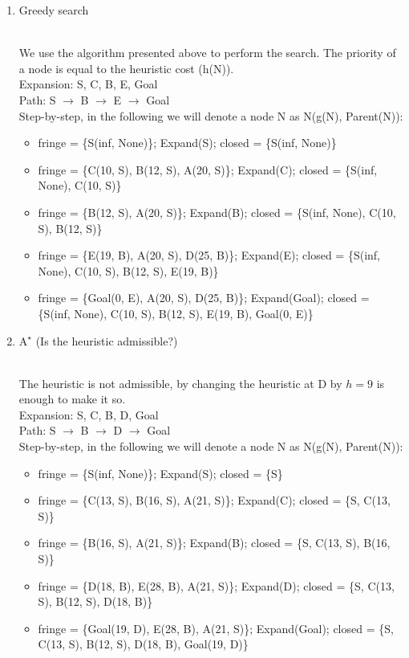 \documentclass[9pt,a4paper]{extarticle}
\newenvironment{solution}
    {%
    \color{red}
    }
    { 
    \color{black}
    }
\begin{document}
\begin{enumerate}
\begin{solution}
\begin{itemize}
        \end{itemize}
        \end{solution}
        \item Greedy search
        \begin{solution}
        \\
        We use the algorithm presented above to perform the search. The priority of a node is equal to the heuristic cost (h(N)).\\
        Expansion: S, C, B, E, Goal\\
        Path: S $\rightarrow$ B $\rightarrow$ E $\rightarrow$ Goal\\
        Step-by-step, in the following we will denote a node N as N(g(N), Parent(N)):
        \begin{itemize}
            \item fringe = \{S(inf, None)\}; Expand(S); closed = \{S(inf, None)\}
            \item fringe = \{C(10, S), B(12, S), A(20, S)\}; Expand(C); closed = \{S(inf, None), C(10, S)\}
            \item fringe = \{B(12, S), A(20, S)\}; Expand(B); closed = \{S(inf, None), C(10, S), B(12, S)\}
            \item fringe = \{E(19, B), A(20, S), D(25, B)\}; Expand(E); closed = \{S(inf, None), C(10, S), B(12, S), E(19, B)\}
            \item fringe = \{Goal(0, E), A(20, S), D(25, B)\}; Expand(Goal); closed = \{S(inf, None), C(10, S), B(12, S), E(19, B), Goal(0, E)\}
        \end{itemize}
        \end{solution}
        \item $\text{A}^\star$ (Is the heuristic admissible?)
        \begin{solution}
        \\
        The heuristic is not admissible, by changing the heuristic at D by $h=9$ is enough to make it so.
        \\
        Expansion: S, C, B, D, Goal\\
        Path: S $\rightarrow$ B $\rightarrow$ D $\rightarrow$ Goal\\
        Step-by-step, in the following we will denote a node N as N(g(N), Parent(N)):
        \begin{itemize}
            \item fringe = \{S(inf, None)\}; Expand(S); closed = \{S\}
            \item fringe = \{C(13, S), B(16, S), A(21, S)\}; Expand(C); closed = \{S, C(13, S)\}
            \item fringe = \{B(16, S), A(21, S)\}; Expand(B); closed = \{S, C(13, S), B(16, S)\}
            \item fringe = \{D(18, B), E(28, B), A(21, S)\}; Expand(D); closed = \{S, C(13, S), B(12, S), D(18, B)\}
            \item fringe = \{Goal(19, D), E(28, B), A(21, S)\}; Expand(Goal); closed = \{S, C(13, S), B(12, S), D(18, B), Goal(19, D)\}
        \end{itemize}
        \end{solution}
    \end{enumerate}
\end{document}
